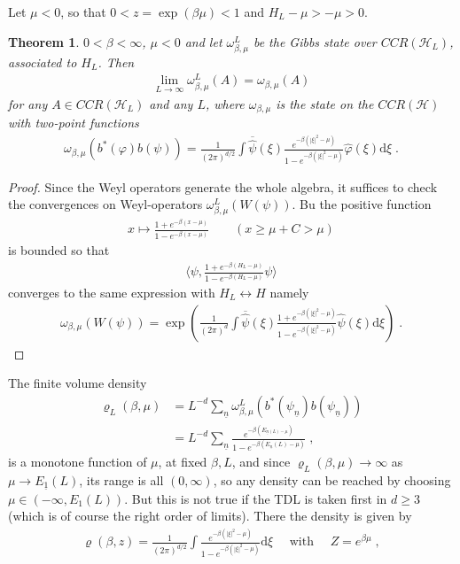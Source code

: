 \documentclass[
a4paper, %
11pt, %
onecolumn, %
openany, %
]{memoir}
\theoremstyle{definition}
\theoremstyle{remark}
\theoremstyle{plain}
\newtheorem{theorem}{Theorem}[chapter]
\begin{document}
	Let $\mu<0$, so that $0<z=\exp(\beta \mu)<1$ and $H_L-\mu>-\mu>0$.
	\begin{theorem}
		$0<\beta<\infty$, $\mu<0$ and let $\omega_{\beta,\mu}^L$ be the Gibbs state over $CCR(\mathcal{H}_L)$, associated to $H_L$. Then \begin{align}
		\lim_{L\rightarrow\infty}\omega_{\beta,\mu}^L(A)=\omega_{\beta,\mu}(A)
		\end{align}
		for any $A\in CCR(\mathcal{H}_{L})$ and any $L$, where $\omega_{\beta,\mu}$ is the state on the $CCR(\mathcal{H})$ with two-point functions \begin{align}
		\omega_{\beta,\mu}(b^*(\varphi)b(\psi))=\frac{1}{(2\pi)^{d/2}}\int \overline{\hat{\psi}}(\xi)\frac{e^{-\beta(|\xi|^2-\mu)}}{1-e^{-\beta(|\xi|^2-\mu)}}\hat{\varphi}(\xi)\mathrm{d}\xi\; .
		\end{align}
	\end{theorem}
\begin{proof}
	Since the Weyl operators generate the whole algebra, it suffices to check the convergences on Weyl-operators $\omega_{\beta,\mu}^L(W(\psi))$. Bu the positive function \begin{align}
	x\mapsto \frac{1+e^{-\beta(x-\mu)}}{1-e^{-\beta(x-\mu)}}\qquad (x\geq \mu+C>\mu)
	\end{align}
	is bounded so that \begin{align}
	\langle \psi, \frac{1+e^{-\beta(H_L-\mu)}}{1-e^{-\beta(H_L-\mu)}}\psi\rangle
	\end{align}
	converges to the same expression with $H_L\leftrightarrow H$ namely \begin{align}
	\omega_{\beta,\mu}(W(\psi))=\exp\left(\frac{1}{(2\pi)^d}\int \overline{\hat{\psi}}(\xi)\frac{1+e^{-\beta(|\xi|^2-\mu)}}{1-e^{-\beta(|\xi|^2-\mu)}}\hat{\psi}(\xi)\mathrm{d}\xi\right)\; .
	\end{align}
\end{proof}
The finite volume density \begin{align}
\varrho_L(\beta,\mu)&=L^{-d}\sum_{\underline{n}}\omega_{\beta,\mu}^L(b^*(\psi_{\underline{n}})b(\psi_{\underline{n}}))\\
&=L^{-d}\sum_{\underline{n}}\frac{e^{-\beta(E_{\underline{n}(L)-\mu})}}{1-e^{-\beta(E_{\underline{n}}(L)-\mu)}}\; ,
\end{align}
is a monotone function of $\mu$, at fixed $\beta, L$, and since $\varrho_L(\beta,\mu)\rightarrow\infty$ as $\mu\rightarrow E_{\underline{1}}(L)$, its range is all $(0,\infty)$, so any density can be reached by choosing $\mu\in(-\infty,E_1(L))$. But this is not true if the TDL is taken first in $d\geq 3$ (which is of course the right order of limits). There the density is given by \begin{align}
\varrho(\beta, z)=\frac{1}{(2\pi)^{d/2}} \int \frac{e^{-\beta(|\xi|^2-\mu)}}{1-e^{-\beta(|\xi|^2-\mu)}}\mathrm{d}\xi \quad\text{ with }\quad Z=e^{\beta\mu}\;,
\end{align}
\end{document}

